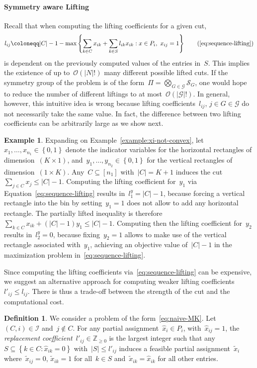 \documentclass[a4paper,10pt]{article}
\newcommand{\Z}{\mathds{Z}}
\newcommand{\fixed}[1]{\hat{ #1 }}
\newcommand{\lift}{l}
\newcommand{\sym}[1]{\mathcal{S}_{#1}}
\newcommand{\define}{\coloneqq}
\newcommand{\brackets}[1]{\left\{ #1 \right\}}
\newcommand{\parentheses}[1]{\left( #1 \right)}
\newcommand{\Oh}[1]{\mathcal{O}\parentheses{ #1 }}
\theoremstyle{definition}
\newtheorem{definition}[theorem]{Definition}
\newtheorem{example}[theorem]{Example}
\begin{document}
\paragraph{Symmetry aware Lifting}
Recall that when computing the lifting coefficients for a given cut,
\begin{equation}
    \lift_{ij} \define |C| -1 - \max\brackets{
    \sum_{k\in C} x_{ik} + \sum_{k\in S} \lift_{ik} x_{ik} : x\in P_i,\ x_{ij} = 1
  }
  \tag{\ref{eq:sequence-lifting}}
\end{equation}
is dependent on the previously computed values of the entries in~$S$.
This implies the existence of up to~$\Oh{|N|!}$ many different possible lifted cuts.
If the symmetry group of the problem is of the form~$\Pi = \bigotimes_{G\in\mathcal{G}}\sym{G}$, one would hope to reduce the number of different liftings to at most~$\Oh{|\mathcal{G}|!}$.
In general, however, this intuitive idea is wrong because lifting coefficients~$\lift_{ij}$, $j \in G \in \mathcal{G}$ do not necessarily take the same value.
In fact, the difference between two lifting coefficients can be arbitrarily large as we show next.
%
\begin{example}
  \label{example:arbitrary-lifting-diff}
  Expanding on Example~\ref{example:xi-not-convex}, let~$x_1, \dots, x_{n_1}\in\brackets{0, 1}$ denote the indicator variables for the horizontal rectangles of dimension~$(K\times 1)$, and~$y_1, \dots, y_{n_2}\in\brackets{0, 1}$ for the vertical rectangles of dimension~$(1\times K)$.
  Any~$C\subseteq [n_1]$ with~$|C| = K + 1$ induces the cut~$\sum_{j\in C} x_j \leq |C| - 1$.
  Computing the lifting coefficient for~$y_1$ via Equation~\eqref{eq:sequence-lifting} results in~$\lift^y_1 = |C| - 1$, because forcing a vertical rectangle into the bin by setting~$y_1 = 1$ does not allow to add any horizontal rectangle.
  The partially lifted inequality is therefore~$\sum_{k \in C} x_{ik} + (|C| - 1)y_1 \leq |C| - 1$.
  Computing then the lifting coefficient for~$y_2$ results in~$\lift^y_2 = 0$, because fixing~$y_2 = 1$ allows to make use of the vertical rectangle associated with~$y_1$, achieving an objective value of~$|C| - 1$ in the maximization problem in~\eqref{eq:sequence-lifting}.
\end{example}
%
Since computing the lifting coefficients via~\eqref{eq:sequence-lifting} can be expensive, we suggest an alternative approach for computing weaker lifting coefficients~$\lift'_{ij} \leq \lift_{ij}$.
There is thus a trade-off between the strength of the cut and the computational cost.
%
\begin{definition}
  \label{def:replacement-coef}
  We consider a problem of the form~\eqref{eq:naive-MK}.
  Let~$(C, i)\in\mathcal{I}$ and~$j\notin C$.
  For any partial assignment~$\fixed{x}_i\in P_i$, with~$\fixed{x}_{ij}=1$, the \emph{replacement coefficient}~$\lift'_{ij}\in\Z_{\geq 0}$ is the largest integer such that any~$S\subseteq \brackets{k\in C: \fixed{x}_{ik} = 0}$ with~$|S|\leq \lift'_{ij}$ induces a feasible partial assignment~$\tilde{x}_i$ where~$\tilde{x}_{ij} = 0$, $\tilde{x}_{ik} = 1$ for all~$k\in S$ and~$\tilde{x}_{ik} = \fixed{x}_{ik}$ for all other entries.
\end{definition}
\end{document}
